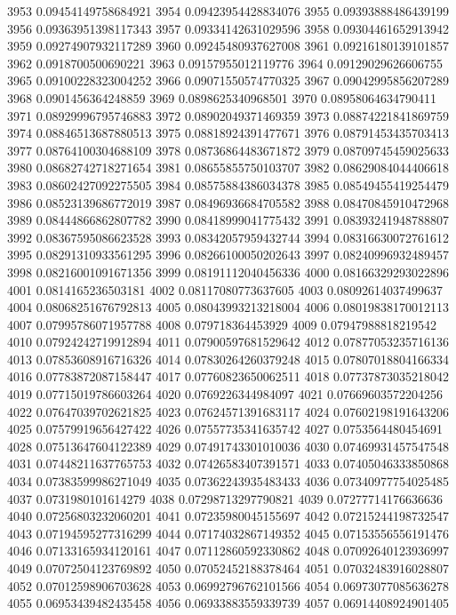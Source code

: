 3953 0.09454149758684921
3954 0.09423954428834076
3955 0.09393888486439199
3956 0.09363951398117343
3957 0.09334142631029596
3958 0.09304461652913942
3959 0.09274907932117289
3960 0.09245480937627008
3961 0.09216180139101857
3962 0.0918700500690221
3963 0.09157955012119776
3964 0.09129029626606755
3965 0.09100228323004252
3966 0.09071550574770325
3967 0.09042995856207289
3968 0.0901456364248859
3969 0.0898625340968501
3970 0.08958064634790411
3971 0.08929996795746883
3972 0.08902049371469359
3973 0.08874221841869759
3974 0.08846513687880513
3975 0.08818924391477671
3976 0.08791453435703413
3977 0.08764100304688109
3978 0.08736864483671872
3979 0.08709745459025633
3980 0.08682742718271654
3981 0.08655855750103707
3982 0.08629084044406618
3983 0.08602427092275505
3984 0.08575884386034378
3985 0.08549455419254479
3986 0.08523139686772019
3987 0.08496936684705582
3988 0.08470845910472968
3989 0.08444866862807782
3990 0.08418999041775432
3991 0.08393241948788807
3992 0.08367595086623528
3993 0.08342057959432744
3994 0.08316630072761612
3995 0.08291310933561295
3996 0.08266100050202643
3997 0.08240996932489457
3998 0.08216001091671356
3999 0.08191112040456336
4000 0.08166329293022896
4001 0.0814165236503181
4002 0.08117080773637605
4003 0.08092614037499637
4004 0.08068251676792813
4005 0.08043993213218004
4006 0.08019838170012113
4007 0.07995786071957788
4008 0.079718364453929
4009 0.07947988818219542
4010 0.07924242719912894
4011 0.07900597681529642
4012 0.07877053235716136
4013 0.07853608916716326
4014 0.07830264260379248
4015 0.07807018804166334
4016 0.07783872087158447
4017 0.07760823650062511
4018 0.07737873035218042
4019 0.07715019786603264
4020 0.0769226344984097
4021 0.07669603572204256
4022 0.07647039702621825
4023 0.07624571391683117
4024 0.07602198191643206
4025 0.07579919656427422
4026 0.07557735341635742
4027 0.0753564480454691
4028 0.07513647604122389
4029 0.07491743301010036
4030 0.07469931457547548
4031 0.07448211637765753
4032 0.07426583407391571
4033 0.07405046333850868
4034 0.07383599986271049
4035 0.07362243935483433
4036 0.07340977754025485
4037 0.0731980101614279
4038 0.07298713297790821
4039 0.07277714176636636
4040 0.07256803232060201
4041 0.07235980045155697
4042 0.07215244198732547
4043 0.07194595277316299
4044 0.07174032867149352
4045 0.07153556556191476
4046 0.07133165934120161
4047 0.07112860592330862
4048 0.07092640123936997
4049 0.07072504123769892
4050 0.07052452188378464
4051 0.07032483916028807
4052 0.07012598906703628
4053 0.06992796762101566
4054 0.06973077085636278
4055 0.06953439482435458
4056 0.06933883559339739
4057 0.06914408924901405
